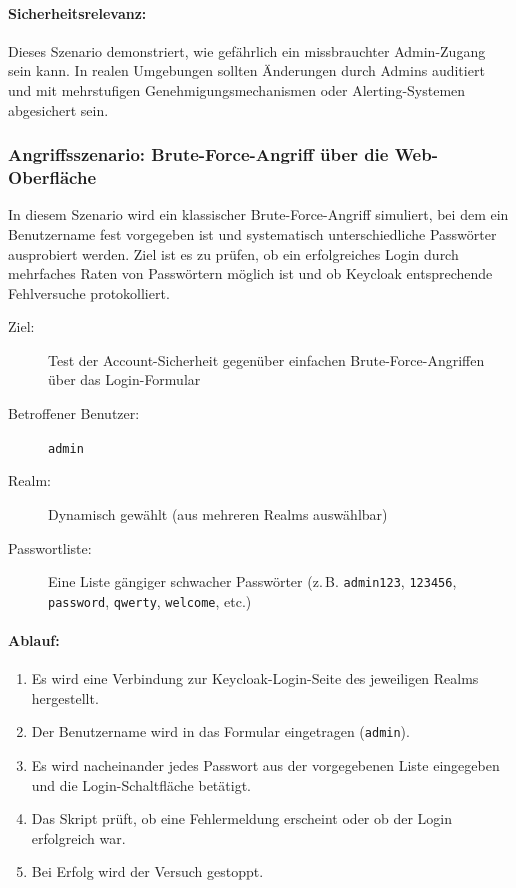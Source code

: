 \documentclass[a4paper,12pt]{article}
\begin{document}
	\paragraph{Sicherheitsrelevanz:}
	Dieses Szenario demonstriert, wie gefährlich ein missbrauchter Admin-Zugang sein kann. In realen Umgebungen sollten Änderungen durch Admins auditiert und mit mehrstufigen Genehmigungsmechanismen oder Alerting-Systemen abgesichert sein.

	\subsubsection{Angriffsszenario: Brute-Force-Angriff über die Web-Oberfläche}
	In diesem Szenario wird ein klassischer Brute-Force-Angriff simuliert, bei dem ein Benutzername fest vorgegeben ist und systematisch unterschiedliche Passwörter ausprobiert werden. Ziel ist es zu prüfen, ob ein erfolgreiches Login durch mehrfaches Raten von Passwörtern möglich ist und ob Keycloak entsprechende Fehlversuche protokolliert.
	
	\begin{description}
		\item[Ziel:] Test der Account-Sicherheit gegenüber einfachen Brute-Force-Angriffen über das Login-Formular
		\item[Betroffener Benutzer:] \texttt{admin}
		\item[Realm:] Dynamisch gewählt (aus mehreren Realms auswählbar)
		\item[Passwortliste:] Eine Liste gängiger schwacher Passwörter (z.\,B. \texttt{admin123}, \texttt{123456}, \texttt{password}, \texttt{qwerty}, \texttt{welcome}, etc.)
	\end{description}
	
	\paragraph{Ablauf:}
	\begin{enumerate}
		\item Es wird eine Verbindung zur Keycloak-Login-Seite des jeweiligen Realms hergestellt.
		\item Der Benutzername wird in das Formular eingetragen (\texttt{admin}).
		\item Es wird nacheinander jedes Passwort aus der vorgegebenen Liste eingegeben und die Login-Schaltfläche betätigt.
		\item Das Skript prüft, ob eine Fehlermeldung erscheint oder ob der Login erfolgreich war.
		\item Bei Erfolg wird der Versuch gestoppt.
	\end{enumerate}
	
\end{document}
